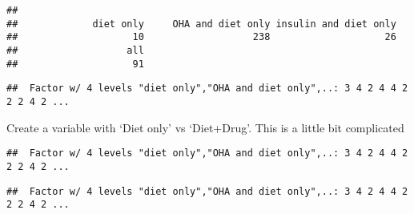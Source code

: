 \documentclass[]{book}
\newenvironment{Shaded}{\begin{snugshade}}{\end{snugshade}}
\newcommand{\KeywordTok}[1]{\textcolor[rgb]{0.13,0.29,0.53}{\textbf{#1}}}
\newcommand{\OperatorTok}[1]{\textcolor[rgb]{0.81,0.36,0.00}{\textbf{#1}}}
\newcommand{\NormalTok}[1]{#1}
\theoremstyle{definition}
\theoremstyle{definition}
\theoremstyle{remark}
\begin{document}
\begin{verbatim}
## 
##             diet only     OHA and diet only insulin and diet only 
##                    10                   238                    26 
##                   all 
##                    91
\end{verbatim}

\begin{Shaded}
\end{Shaded}

\begin{verbatim}
##  Factor w/ 4 levels "diet only","OHA and diet only",..: 3 4 2 4 4 2 2 2 4 2 ...
\end{verbatim}

Create a variable with `Diet only' vs `Diet+Drug'. This is a little bit
complicated

\begin{Shaded}
\end{Shaded}

\begin{verbatim}
##  Factor w/ 4 levels "diet only","OHA and diet only",..: 3 4 2 4 4 2 2 2 4 2 ...
\end{verbatim}

\begin{Shaded}
\end{Shaded}

\begin{verbatim}
##  Factor w/ 4 levels "diet only","OHA and diet only",..: 3 4 2 4 4 2 2 2 4 2 ...
\end{verbatim}

\begin{Shaded}
\end{Shaded}
\end{document}
